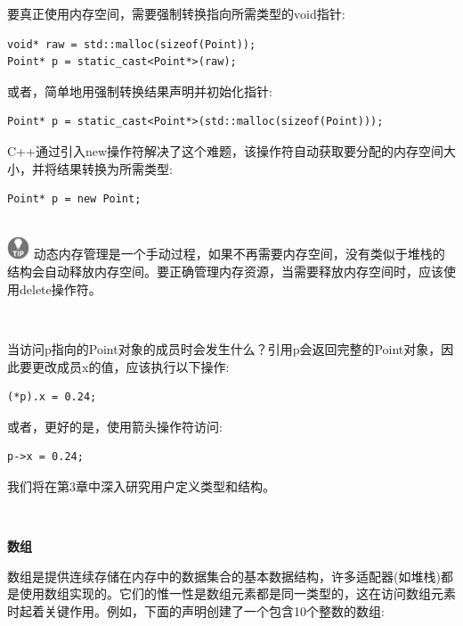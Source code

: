 要真正使用内存空间，需要强制转换指向所需类型的void指针:\par

\begin{lstlisting}[caption={}]
void* raw = std::malloc(sizeof(Point));
Point* p = static_cast<Point*>(raw);
\end{lstlisting}

或者，简单地用强制转换结果声明并初始化指针: \par

\begin{lstlisting}[caption={}]
Point* p = static_cast<Point*>(std::malloc(sizeof(Point)));
\end{lstlisting}

C++通过引入new操作符解决了这个难题，该操作符自动获取要分配的内存空间大小，并将结果转换为所需类型:\par

\begin{lstlisting}[caption={}]
Point* p = new Point;
\end{lstlisting}

\hspace*{\fill} \\ %
\includegraphics[width=0.05\textwidth]{images/tip}
动态内存管理是一个手动过程，如果不再需要内存空间，没有类似于堆栈的结构会自动释放内存空间。要正确管理内存资源，当需要释放内存空间时，应该使用delete操作符。 \par
\noindent\textbf{}\ \par

当访问p指向的Point对象的成员时会发生什么？引用p会返回完整的Point对象，因此要更改成员x的值，应该执行以下操作: \par

\begin{lstlisting}[caption={}]
(*p).x = 0.24;
\end{lstlisting}

或者，更好的是，使用箭头操作符访问: \par

\begin{lstlisting}[caption={}]
p->x = 0.24;
\end{lstlisting}

我们将在第3章中深入研究用户定义类型和结构。\par

\noindent\textbf{}\ \par
\textbf{数组} \ \par
数组是提供连续存储在内存中的数据集合的基本数据结构，许多适配器(如堆栈)都是使用数组实现的。它们的惟一性是数组元素都是同一类型的，这在访问数组元素时起着关键作用。例如，下面的声明创建了一个包含10个整数的数组: \par

